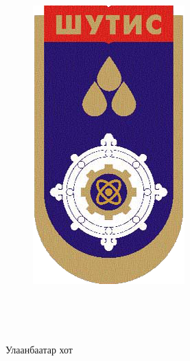 \pagecolor{Cover}
\begin{titlepage}
\begin{center}

{\scshape\LARGE \univname\par} %
{\scshape\Large \facname\par}\vspace{0.5cm} %

\begin{figure}[!htbp]
\centering
\includegraphics[scale=0.2]{figures/MUST_logo.png}
\end{figure}

\vspace{1cm}
\hfill \large{\longname} \\

\vspace{1cm}

{\huge \bfseries \ttitle\par}\vspace{0.4cm} %

\vspace{3cm}
\textsc{\Large {\thesisname}}\\ %

\vfill

\large {Улаанбаатар хот} \\
 
\end{center}
\end{titlepage}
\pagecolor{white}

